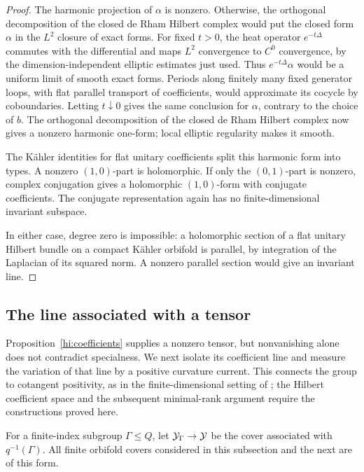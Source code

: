 \begin{proof}
The harmonic projection of \(\alpha\) is nonzero. Otherwise, the
orthogonal decomposition of the closed de Rham Hilbert complex
would put the closed form \(\alpha\) in the \(L^2\) closure of
exact forms. For fixed \(t>0\), the heat operator
\(e^{-t\Delta}\) commutes with the
differential and maps \(L^2\) convergence to \(C^0\) convergence,
by the dimension-independent elliptic estimates just used.
Thus \(e^{-t\Delta}\alpha\) would be a uniform limit of smooth exact
forms. Periods along finitely many fixed generator loops, with flat
parallel transport of coefficients, would approximate its cocycle
by coboundaries. Letting \(t\downarrow0\) gives the same conclusion
for \(\alpha\), contrary to the choice of \(b\).
The orthogonal decomposition of the closed de Rham Hilbert complex
now gives a nonzero harmonic one-form; local elliptic regularity
makes it smooth.

The K\"ahler identities for flat unitary coefficients split this
harmonic form into types. A nonzero \((1,0)\)-part is holomorphic.
If only the \((0,1)\)-part is nonzero, complex conjugation gives a
holomorphic \((1,0)\)-form with conjugate coefficients. The conjugate
representation again has no finite-dimensional invariant subspace.

In either case, degree zero is impossible: a holomorphic section of
a flat unitary Hilbert bundle on a compact K\"ahler orbifold is
parallel, by integration of the Laplacian of its squared norm.
A nonzero parallel section would give an invariant line.
\end{proof}

\subsection{The line associated with a tensor}

Proposition~\ref{hi:coefficients} supplies a nonzero tensor, but
nonvanishing alone does not contradict specialness. We next isolate
its coefficient line and measure the variation of that line by a
positive curvature current. This connects the group to cotangent
positivity, as in the finite-dimensional setting of
\cite{BrunebarbeKlinglerTotaro2013}; the Hilbert coefficient space
and the subsequent minimal-rank argument require the constructions
proved here.

For a finite-index subgroup \(\Gamma\le Q\), let
\(\mathcal Y_\Gamma\to\mathcal Y\) be the cover associated with \(q^{-1}(\Gamma)\).
All finite orbifold covers considered in this subsection and the
next are of this form.

